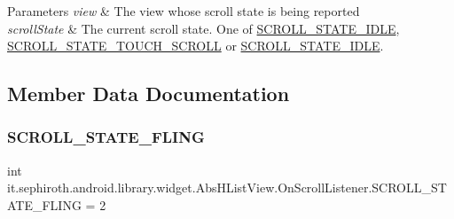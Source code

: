 \begin{DoxyParams}{Parameters}
{\em view} & The view whose scroll state is being reported\\
\hline
{\em scroll\+State} & The current scroll state. One of \hyperlink{interfaceit_1_1sephiroth_1_1android_1_1library_1_1widget_1_1_abs_h_list_view_1_1_on_scroll_listener_a7e8ebaabff9997917f64a44fb32df9c1}{S\+C\+R\+O\+L\+L\+\_\+\+S\+T\+A\+T\+E\+\_\+\+I\+D\+LE}, \hyperlink{interfaceit_1_1sephiroth_1_1android_1_1library_1_1widget_1_1_abs_h_list_view_1_1_on_scroll_listener_ac223314e9f1d1cd748c8478fca711a12}{S\+C\+R\+O\+L\+L\+\_\+\+S\+T\+A\+T\+E\+\_\+\+T\+O\+U\+C\+H\+\_\+\+S\+C\+R\+O\+LL} or \hyperlink{interfaceit_1_1sephiroth_1_1android_1_1library_1_1widget_1_1_abs_h_list_view_1_1_on_scroll_listener_a7e8ebaabff9997917f64a44fb32df9c1}{S\+C\+R\+O\+L\+L\+\_\+\+S\+T\+A\+T\+E\+\_\+\+I\+D\+LE}. \\
\hline
\end{DoxyParams}


\subsection{Member Data Documentation}
\mbox{\label{interfaceit_1_1sephiroth_1_1android_1_1library_1_1widget_1_1_abs_h_list_view_1_1_on_scroll_listener_a2807bd29ac4279868ad19ba76b343bb0}} 
\subsubsection{\texorpdfstring{S\+C\+R\+O\+L\+L\+\_\+\+S\+T\+A\+T\+E\+\_\+\+F\+L\+I\+NG}{SCROLL\_STATE\_FLING}}
{\footnotesize\ttfamily int it.\+sephiroth.\+android.\+library.\+widget.\+Abs\+H\+List\+View.\+On\+Scroll\+Listener.\+S\+C\+R\+O\+L\+L\+\_\+\+S\+T\+A\+T\+E\+\_\+\+F\+L\+I\+NG = 2\hspace{0.3cm}{\ttfamily [static]}}

